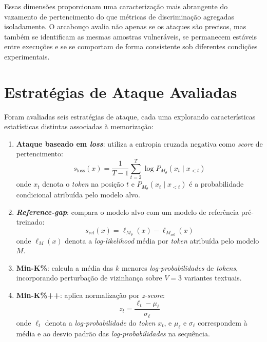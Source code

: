 \documentclass[
	12pt,				%
	openright,			%
	oneside,			%
	a4paper,			%
	english,			%
	french,				%
	spanish,			%
	brazil,				%
	]{abntex2}
\begin{document}
Essas dimensões proporcionam uma caracterização mais abrangente do vazamento de pertencimento do que métricas de discriminação agregadas isoladamente. O arcabouço avalia não apenas se os ataques são precisos, mas também se identificam as mesmas amostras vulneráveis, se permanecem estáveis entre execuções e se se comportam de forma consistente sob diferentes condições experimentais.

\section{Estratégias de Ataque Avaliadas}

Foram avaliadas seis estratégias de ataque, cada uma explorando características estatísticas distintas associadas à memorização:

\begin{enumerate}[label=(\roman*)]
    \item \textbf{Ataque baseado em \textit{loss}}: utiliza a entropia cruzada negativa como \textit{score} de pertencimento:
    \begin{equation}
    s_{\mathrm{loss}}(x) = \frac{1}{T-1}\sum_{t=2}^{T} \log P_{M_\theta}(x_t \mid x_{<t})
    \end{equation}
    onde $x_t$ denota o \textit{token} na posição $t$ e $P_{M_\theta}(x_t \mid x_{<t})$ é a probabilidade condicional atribuída pelo modelo alvo.

    \item \textbf{\textit{Reference-gap}}: compara o modelo alvo com um modelo de referência pré-treinado:
    \begin{equation}
    s_{\mathrm{ref}}(x) = \ell_{M_\theta}(x) - \ell_{M_{\mathrm{ref}}}(x)
    \end{equation}
    onde $\ell_M(x)$ denota a \textit{log-likelihood} média por \textit{token} atribuída pelo modelo $M$.

    \item \textbf{Min-K\%}: calcula a média das $k$ menores \textit{log-probabilidades} de \textit{tokens}, incorporando perturbação de vizinhança sobre $V=3$ variantes textuais.

    \item \textbf{Min-K\%++}: aplica normalização por \textit{z-score}:
    \begin{equation}
    z_t = \frac{\ell_t - \mu_\ell}{\sigma_\ell}
    \end{equation}
    onde $\ell_t$ denota a \textit{log-probabilidade} do \textit{token} $x_t$, e $\mu_\ell$ e $\sigma_\ell$ correspondem à média e ao desvio padrão das \textit{log-probabilidades} na sequência.


\end{enumerate}
\end{document}
